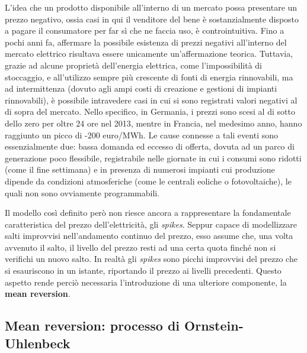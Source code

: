 \documentclass[12pt,a4paper]{report}
\begin{document}
L'idea che un prodotto disponibile all'interno di un mercato possa presentare un prezzo negativo, ossia casi in qui il venditore del bene è sostanzialmente disposto a pagare il consumatore per far sì che ne faccia uso, è controintuitiva. Fino a pochi anni fa, affermare la possibile esistenza di prezzi negativi all'interno del mercato elettrico risultava essere unicamente un'affermazione teorica. Tuttavia, grazie ad alcune proprietà dell'energia elettrica, come l'impossibilità di stoccaggio, e all'utilizzo sempre più crescente di fonti di energia rinnovabili, ma ad intermittenza (dovuto agli ampi costi di creazione e gestioni di impianti rinnovabili), è possibile intravedere casi in cui si sono registrati valori negativi al di sopra del mercato. Nello specifico, in Germania, i prezzi sono scesi al di sotto dello zero per oltre 24 ore nel 2013, mentre in Francia, nel medesimo anno, hanno raggiunto un picco di -200 euro/MWh. Le cause connesse a tali eventi sono essenzialmente due: bassa domanda ed eccesso di offerta, dovuta ad un parco di generazione poco flessibile, registrabile nelle giornate in cui i consumi sono ridotti (come il fine settimana) e in presenza di numerosi impianti cui produzione dipende da condizioni atmosferiche (come le centrali eoliche o fotovoltaiche), le quali non sono ovviamente programmabili.

Il modello così definito però non riesce ancora a rappresentare la fondamentale caratteristica del prezzo dell’elettricità, gli \textit{spikes}. Seppur capace di modellizzare salti improvvisi nell’andamento continuo del prezzo, esso assume che, una volta avvenuto il salto, il livello del prezzo resti ad una certa quota finché non si verifichi un nuovo salto. In realtà gli \textit{spikes} sono picchi improvvisi del prezzo che si esauriscono in un istante, riportando il prezzo ai livelli precedenti. Questo aspetto rende perciò necessaria l'introduzione di una ulteriore componente, la \textbf{mean reversion}.

\subsection{Mean reversion: processo di Ornstein-Uhlenbeck}
\end{document}
